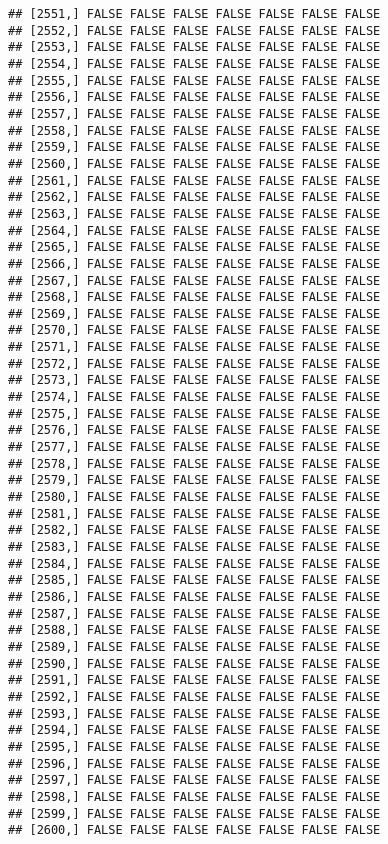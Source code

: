 \documentclass[
]{article}
\begin{document}
\begin{verbatim}
## [2551,] FALSE FALSE FALSE FALSE FALSE FALSE FALSE
## [2552,] FALSE FALSE FALSE FALSE FALSE FALSE FALSE
## [2553,] FALSE FALSE FALSE FALSE FALSE FALSE FALSE
## [2554,] FALSE FALSE FALSE FALSE FALSE FALSE FALSE
## [2555,] FALSE FALSE FALSE FALSE FALSE FALSE FALSE
## [2556,] FALSE FALSE FALSE FALSE FALSE FALSE FALSE
## [2557,] FALSE FALSE FALSE FALSE FALSE FALSE FALSE
## [2558,] FALSE FALSE FALSE FALSE FALSE FALSE FALSE
## [2559,] FALSE FALSE FALSE FALSE FALSE FALSE FALSE
## [2560,] FALSE FALSE FALSE FALSE FALSE FALSE FALSE
## [2561,] FALSE FALSE FALSE FALSE FALSE FALSE FALSE
## [2562,] FALSE FALSE FALSE FALSE FALSE FALSE FALSE
## [2563,] FALSE FALSE FALSE FALSE FALSE FALSE FALSE
## [2564,] FALSE FALSE FALSE FALSE FALSE FALSE FALSE
## [2565,] FALSE FALSE FALSE FALSE FALSE FALSE FALSE
## [2566,] FALSE FALSE FALSE FALSE FALSE FALSE FALSE
## [2567,] FALSE FALSE FALSE FALSE FALSE FALSE FALSE
## [2568,] FALSE FALSE FALSE FALSE FALSE FALSE FALSE
## [2569,] FALSE FALSE FALSE FALSE FALSE FALSE FALSE
## [2570,] FALSE FALSE FALSE FALSE FALSE FALSE FALSE
## [2571,] FALSE FALSE FALSE FALSE FALSE FALSE FALSE
## [2572,] FALSE FALSE FALSE FALSE FALSE FALSE FALSE
## [2573,] FALSE FALSE FALSE FALSE FALSE FALSE FALSE
## [2574,] FALSE FALSE FALSE FALSE FALSE FALSE FALSE
## [2575,] FALSE FALSE FALSE FALSE FALSE FALSE FALSE
## [2576,] FALSE FALSE FALSE FALSE FALSE FALSE FALSE
## [2577,] FALSE FALSE FALSE FALSE FALSE FALSE FALSE
## [2578,] FALSE FALSE FALSE FALSE FALSE FALSE FALSE
## [2579,] FALSE FALSE FALSE FALSE FALSE FALSE FALSE
## [2580,] FALSE FALSE FALSE FALSE FALSE FALSE FALSE
## [2581,] FALSE FALSE FALSE FALSE FALSE FALSE FALSE
## [2582,] FALSE FALSE FALSE FALSE FALSE FALSE FALSE
## [2583,] FALSE FALSE FALSE FALSE FALSE FALSE FALSE
## [2584,] FALSE FALSE FALSE FALSE FALSE FALSE FALSE
## [2585,] FALSE FALSE FALSE FALSE FALSE FALSE FALSE
## [2586,] FALSE FALSE FALSE FALSE FALSE FALSE FALSE
## [2587,] FALSE FALSE FALSE FALSE FALSE FALSE FALSE
## [2588,] FALSE FALSE FALSE FALSE FALSE FALSE FALSE
## [2589,] FALSE FALSE FALSE FALSE FALSE FALSE FALSE
## [2590,] FALSE FALSE FALSE FALSE FALSE FALSE FALSE
## [2591,] FALSE FALSE FALSE FALSE FALSE FALSE FALSE
## [2592,] FALSE FALSE FALSE FALSE FALSE FALSE FALSE
## [2593,] FALSE FALSE FALSE FALSE FALSE FALSE FALSE
## [2594,] FALSE FALSE FALSE FALSE FALSE FALSE FALSE
## [2595,] FALSE FALSE FALSE FALSE FALSE FALSE FALSE
## [2596,] FALSE FALSE FALSE FALSE FALSE FALSE FALSE
## [2597,] FALSE FALSE FALSE FALSE FALSE FALSE FALSE
## [2598,] FALSE FALSE FALSE FALSE FALSE FALSE FALSE
## [2599,] FALSE FALSE FALSE FALSE FALSE FALSE FALSE
## [2600,] FALSE FALSE FALSE FALSE FALSE FALSE FALSE

\end{verbatim}
\end{document}
